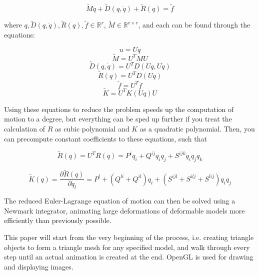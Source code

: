 \documentclass[twocolumn,10pt]{asme2ej}
\begin{document}
\begin{equation}
\tilde{M}\ddot q + \tilde{D}(q, \dot q) + \tilde{R}(q) = \tilde{f}
\label{eq_rmotion}
\end{equation}

where $q, \tilde{D}(q, \dot q), \tilde{R}(q), \tilde{f} \in \mathbb{R}^{r}$, $\tilde{M} \in \mathbb{R}^{r \times r}$, and each
can be found through the equations:

\begin{equation}
u = Uq
\label{eq_basisreduction}
\end{equation}
\begin{equation}
\tilde{M} = U^{T}MU
\label{eq_rmass}
\end{equation}
\begin{equation}
\tilde{D}(q, \dot q) = U^{T}D(Uq, U \dot q)
\label{eq_rdamp}
\end{equation}
\begin{equation}
\tilde{R}(q) = U^{T}D(Uq)
\label{eq_rinternal}
\end{equation}
\begin{equation}
\tilde{f} = U^{T}f
\label{eq_rexternal}
\end{equation}
\begin{equation}
\tilde{K} = U^{T}K(Uq)U
\label{eq_rstiffness}
\end{equation}

Using these equations to reduce the problem speeds up the computation of motion to a degree, but everything can be
sped up further if you treat the calculation of $R$ as cubic polynomial and $K$ as a quadratic polynomial. Then,
you can precompute constant coefficients to these equations, such that

\begin{equation}
\tilde{R}(q) = U^{T}R(q) = P^{i}q_{i} + Q^{ij}q_{i}q_{j} + S^{ijk}q_{i}q_{j}q_{k}
\label{eq_rcubicpoly}
\end{equation}

\begin{equation}
\tilde{K}(q) = \frac{\partial \tilde{R}(q)}{\partial q_{l}} = P^{l} + (Q^{li} + Q^{il})q_{i} + (S^{ijl} + S^{ilj} + S^{lij} )q_{i}q_{j}
\label{eq_rquadpoly}
\end{equation}

The reduced Euler-Lagrange equation of motion can then be solved using a Newmark integrator, animating large deformations
of deformable models more efficiently than previously possible.

This paper will start from the very beginning of the process, i.e. creating triangle objects to form a triangle mesh for any
specified model, and walk through every step until an actual animation is created at the end. OpenGL is used for drawing and displaying images. 
\end{document}
